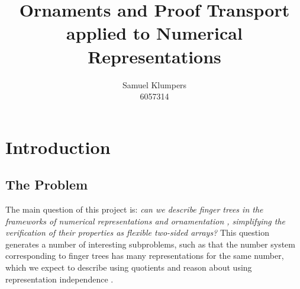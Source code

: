\documentclass[10pt]{article}
\title{Ornaments and Proof Transport applied to Numerical Representations}
\author{Samuel Klumpers\\6057314}
\theoremstyle{plain}%
\theoremstyle{definition}
\begin{document}
\maketitle

\begin{abstract}
\listoftodos
\end{abstract}

\tableofcontents


\section{Introduction}\label{sec:intro}


\subsection{The Problem}
The main question of this project is: \textit{can we describe finger trees \cite{fingertrees} in the frameworks of numerical representations and ornamentation \cite{progorn}, simplifying the verification of their properties as flexible two-sided arrays?} This question generates a number of interesting subproblems, such as that the number system corresponding to finger trees has many representations for the same number, which we expect to describe using quotients \cite{cuagda} and reason about using representation independence \cite{iri}. %
\end{document}
